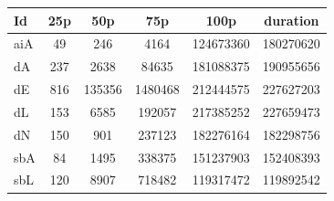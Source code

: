 \begin{tabular}{lccccc}
\toprule
Id & 25p & 50p & 75p & 100p & duration \\
\midrule
aiA & 49 & 246 & 4164 & 124673360 & 180270620 \\
dA & 237 & 2638 & 84635 & 181088375 & 190955656 \\
dE & 816 & 135356 & 1480468 & 212444575 & 227627203 \\
dL & 153 & 6585 & 192057 & 217385252 & 227659473 \\
dN & 150 & 901 & 237123 & 182276164 & 182298756 \\
sbA & 84 & 1495 & 338375 & 151237903 & 152408393 \\
sbL & 120 & 8907 & 718482 & 119317472 & 119892542 \\
\bottomrule
\end{tabular}
